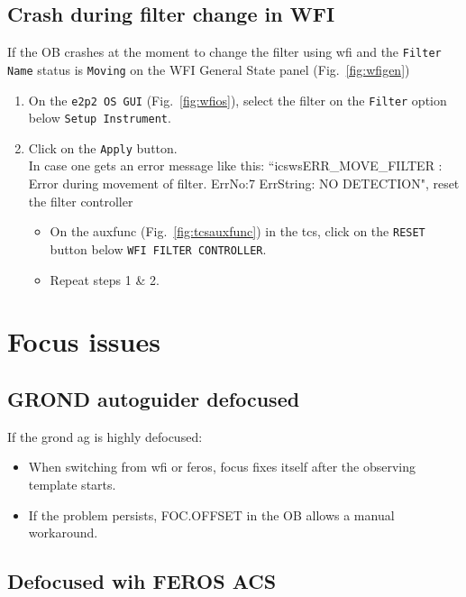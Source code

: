 \documentclass[11pt,fleqn]{book} %
\begin{document}
\subsection{Crash during filter change in WFI}
\label{sec:crashfilter}
If the OB crashes at the moment to change the filter using \gls{wfi} and the \texttt{Filter Name} status is \texttt{Moving} on the WFI General State panel (Fig.~\ref{fig:wfigen})
 \begin{enumerate}
      \item On the \texttt{e2p2 OS GUI} (Fig.~\ref{fig:wfios}), select the filter on the \texttt{Filter} option below \texttt{Setup Instrument}.
      \item Click on the \texttt{Apply} button.\\
           In case one gets an error message like this: ``icswsERR\_MOVE\_FILTER : Error during movement of filter. ErrNo:7 ErrString: NO DETECTION", reset the filter controller
           \begin{itemize}
           \item On the \gls{auxfunc} (Fig.~\ref{fig:tcsauxfunc}) in the \gls{tcs}, click on the \texttt{RESET} button below \texttt {WFI FILTER CONTROLLER}.
           \item Repeat steps 1 \& 2.
           \end{itemize}
 \end{enumerate}

\section{Focus issues}

\subsection{GROND autoguider defocused}

If the \gls{grond} \gls{ag} is highly defocused:
\begin{itemize}
  \item When switching from \gls{wfi} or \gls{feros}, focus fixes itself after the observing template starts.
  \item If the problem persists, FOC.OFFSET in the OB allows a manual workaround.
\end{itemize}

\subsection{Defocused wih FEROS ACS}
\end{document}
